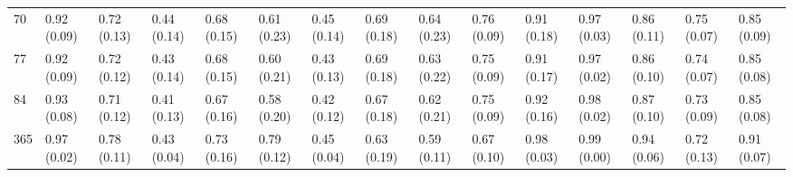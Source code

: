 \begin{tabular}{lllllllllllllll}
70  &  0.92 (0.09) &  0.72 (0.13) &  0.44 (0.14) &  0.68 (0.15) &  0.61 (0.23) &  0.45 (0.14) &  0.69 (0.18) &  0.64 (0.23) &  0.76 (0.09) &  0.91 (0.18) &  0.97 (0.03) &  0.86 (0.11) &  0.75 (0.07) &  0.85 (0.09) \\
77  &  0.92 (0.09) &  0.72 (0.12) &  0.43 (0.14) &  0.68 (0.15) &  0.60 (0.21) &  0.43 (0.13) &  0.69 (0.18) &  0.63 (0.22) &  0.75 (0.09) &  0.91 (0.17) &  0.97 (0.02) &  0.86 (0.10) &  0.74 (0.07) &  0.85 (0.08) \\
84  &  0.93 (0.08) &  0.71 (0.12) &  0.41 (0.13) &  0.67 (0.16) &  0.58 (0.20) &  0.42 (0.12) &  0.67 (0.18) &  0.62 (0.21) &  0.75 (0.09) &  0.92 (0.16) &  0.98 (0.02) &  0.87 (0.10) &  0.73 (0.09) &  0.85 (0.08) \\
365 &  0.97 (0.02) &  0.78 (0.11) &  0.43 (0.04) &  0.73 (0.16) &  0.79 (0.12) &  0.45 (0.04) &  0.63 (0.19) &  0.59 (0.11) &  0.67 (0.10) &  0.98 (0.03) &  0.99 (0.00) &  0.94 (0.06) &  0.72 (0.13) &  0.91 (0.07) \\
\bottomrule
\end{tabular}
